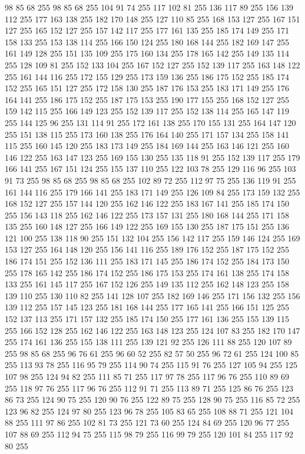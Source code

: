 98 85 68 255 98 85 68 255 104 91 74 255 117 102 81 255 136 117 89 255 156 139 112 255 177 163 138 255 182 170 148 255 127 110 85 255 168 153 127 255 167 151 127 255 165 152 127 255 157 142 117 255 177 161 135 255 185 174 149 255 171 158 133 255 153 138 114 255 166 150 124 255 180 168 144 255 182 169 147 255 161 149 128 255 151 135 109 255 175 160 134 255 178 165 142 255 149 135 114 255 128 109 81 255 152 133 104 255 167 152 127 255 152 139 117 255 163 148 122 255 161 144 116 255 172 155 129 255 173 159 136 255 186 175 152 255 185 174 152 255 165 151 127 255 172 158 130 255 187 176 153 255 183 171 149 255 176 164 141 255 186 175 152 255 187 175 153 255 190 177 155 255 168 152 127 255 159 142 115 255 166 149 123 255 152 139 117 255 152 138 114 255 165 147 119 255 144 125 96 255 131 114 91 255 172 161 138 255 170 155 131 255 164 147 120 255 151 138 115 255 173 160 138 255 176 164 140 255 171 157 134 255 158 141 115 255 160 145 120 255 183 173 149 255 184 169 144 255 163 146 121 255 160 146 122 255
163 147 123 255 169 155 130 255 135 118 91 255 152 139 117 255 179 166 141 255 167 151 124 255 155 137 110 255 122 103 78 255 129 116 96 255 103 91 73 255 98 85 68 255 98 85 68 255 102 89 72 255 112 97 75 255 136 119 91 255 161 144 116 255 179 166 141 255 183 171 149 255 126 109 84 255 173 159 132 255 168 152 127 255 157 144 120 255 162 146 122 255 183 167 141 255 185 174 150 255 156 143 118 255 162 146 122 255 173 157 131 255 180 168 144 255 171 158 135 255 160 148 127 255 166 149 122 255 169 155 130 255 187 175 151 255 136 121 100 255 138 118 90 255 151 132 104 255 156 142 117 255 159 146 124 255 169 153 127 255 164 148 120 255 156 141 116 255 189 176 152 255 187 175 152 255 186 174 151 255 152 136 111 255 183 171 145 255 186 174 152 255 184 173 150 255 178 165 142 255 186 174 152 255 186 175 153 255 174 161 138 255 174 158 133 255 161 145 117 255 167 152 126 255 149 135 112 255 162 148 123 255 158 139 110 255 130 110 82 255 141 128 107 255 182 169 146 255 171 156 132 255 156 139 112 255
157 145 123 255 181 168 144 255 177 165 141 255 166 151 125 255 152 137 113 255 171 157 132 255 185 174 150 255 177 161 136 255 155 139 115 255 166 152 128 255 162 146 122 255 163 148 123 255 124 107 83 255 182 170 147 255 174 161 136 255 155 138 111 255 139 121 92 255 126 111 88 255 120 107 89 255 98 85 68 255 96 76 61 255 96 60 52 255 82 57 50 255 96 72 61 255 124 100 85 255 113 93 78 255 116 95 79 255 114 90 74 255 115 91 76 255 127 105 94 255 125 107 98 255 124 94 82 255 111 85 71 255 117 97 78 255 117 96 76 255 110 89 69 255 118 97 76 255 117 96 76 255 112 91 71 255 113 89 71 255 125 86 76 255 123 86 73 255 124 90 75 255 120 90 76 255 122 89 75 255 128 90 75 255 116 85 72 255 123 96 82 255 124 97 80 255 123 96 78 255 105 83 65 255 108 88 71 255 121 104 88 255 111 97 86 255 102 81 73 255 121 73 60 255 124 84 69 255 120 96 77 255 107 88 69 255 112 94 75 255 115 98 79 255 116 99 79 255 120 101 84 255 117 92 80 255
